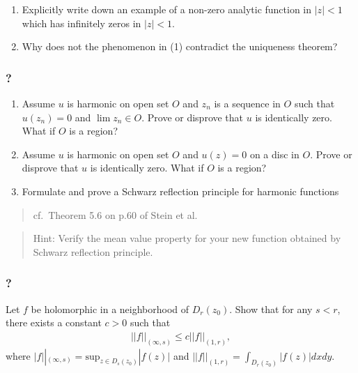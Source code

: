 \begin{enumerate}
\def\labelenumi{(\arabic{enumi})}
\item
  Explicitly write down an example of a non-zero analytic function in
  \(|z|<1\) which has infinitely zeros in \(|z|<1\).
\item
  Why does not the phenomenon in (1) contradict the uniqueness theorem?
\end{enumerate}

\hypertarget{section-161}{%
\subsubsection{?}\label{section-161}}

\begin{enumerate}
\def\labelenumi{(\arabic{enumi})}
\item
  Assume \(u\) is harmonic on open set \(O\) and \(z_n\) is a sequence
  in \(O\) such that \(u(z_n) = 0\) and \(\lim z_n \in O\). Prove or
  disprove that \(u\) is identically zero. What if \(O\) is a region?
\item
  Assume \(u\) is harmonic on open set \(O\) and \(u(z) = 0\) on a disc
  in \(O\). Prove or disprove that \(u\) is identically zero. What if
  \(O\) is a region?
\item
  Formulate and prove a Schwarz reflection principle for harmonic
  functions
\end{enumerate}

\begin{quote}
cf.~Theorem 5.6 on p.60 of Stein et al.
\end{quote}

\begin{quote}
Hint: Verify the mean value property for your new function obtained by
Schwarz reflection principle.
\end{quote}

\hypertarget{section-162}{%
\subsubsection{?}\label{section-162}}

Let \(f\) be holomorphic in a neighborhood of \(D_r(z_0)\). Show that
for any \(s<r\), there exists a constant \(c>0\) such that
\begin{align*}||f||_{(\infty, s)} \leq c ||f||_{(1, r)},\end{align*}
where
\(\displaystyle |f||_{(\infty, s)} = \text{sup}_{z \in D_s(z_0)}|f(z)|\)
and \(\displaystyle ||f||_{(1, r)} = \int_{D_r(z_0)} |f(z)|dx dy\).


